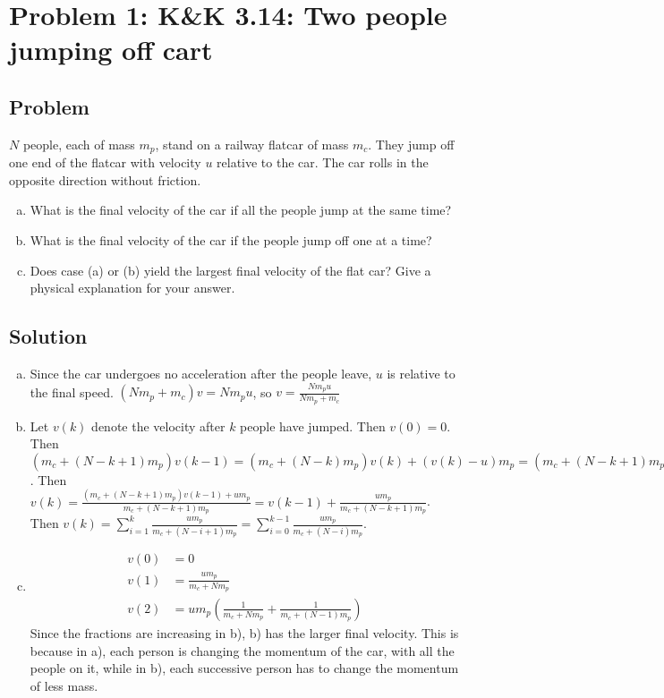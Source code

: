 \documentclass[solutions]{esg8012pset}
\date{October 1}
\begin{document}
\section*{Problem 1: K\&K 3.14: Two people jumping off cart}
\subsection*{Problem}
  $N$ people, each of mass $m_p$, stand on a railway flatcar of mass $m_c$. They jump off one end of the flatcar with velocity $u$ relative to the car. The car rolls in the opposite direction without friction.
  \begin{enumerate}[(a)]
    \item What is the final velocity of the car if all the people jump at the same time?
    \item What is the final velocity of the car if the people jump off one at a time?
    \item Does case (a) or (b) yield the largest final velocity of the flat car?  Give a physical explanation for your answer.
  \end{enumerate}
\subsection*{Solution}
  \begin{enumerate}[a)]
    \item Since the car undergoes no acceleration after the people leave, $u$ is relative to the final speed.  $(N m_p + m_c)v = N m_p u$, so $v = \frac{N m_p u}{N m_p + m_c}$
    \item Let $v(k)$ denote the velocity after $k$ people have jumped.  Then $v(0) = 0$.  Then $(m_c + (N - k + 1)m_p)v(k - 1) = (m_c + (N - k)m_p)v(k) + (v(k) - u) m_p = (m_c + (N - k + 1)m_p)v(k)  - u m_p$.  Then $v(k) = \frac{(m_c + (N - k + 1)m_p)v(k - 1) + u m_p}{m_c + (N - k + 1)m_p} = v(k - 1) + \frac{u m_p}{m_c + (N - k + 1)m_p}$.  Then $v(k) = \sum_{i=1}^{k} \frac{u m_p}{m_c + (N - i + 1)m_p} = \sum_{i=0}^{k-1} \frac{u m_p}{m_c + (N - i)m_p}$.
    \item \begin{align*} v(0) & = 0 \\
      v(1) & = \frac{u m_p}{m_c + N m_p} \\
      v(2) & = u m_p\left(\frac{1}{m_c + N m_p} + \frac{1}{m_c + (N - 1) m_p}\right)
    \end{align*} Since the fractions are increasing in b), b) has the larger final velocity.  This is because in a), each person is changing the momentum of the car, with all the people on it, while in b), each successive person has to change the momentum of less mass.
  \end{enumerate}
\end{document}
